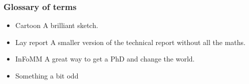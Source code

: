 \documentclass{infommlay}
\begin{document}
\subsubsection*{Glossary of terms}

\begin{itemize}
	\item{Cartoon} A brilliant sketch.
	\item{Lay report} A smaller version of the technical report without all the maths.
	\item{InFoMM} A great way to get a PhD and change the world. 
	\item{Something a bit odd} 
\end{itemize}


\lipsum[1]
\end{document}
